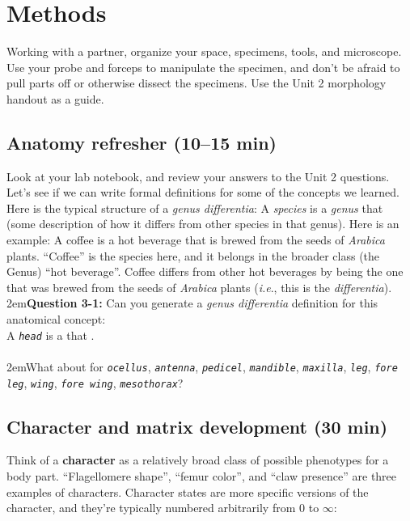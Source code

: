 \documentclass[letterpaper, 11pt]{article}
\newcommand{\latinword}[1]{\texttt{\itshape #1}}%
\begin{document}
\section*{Methods}
Working with a partner, organize your space, specimens, tools, and microscope. Use your probe and forceps to manipulate the specimen, and don't be afraid to pull parts off or otherwise dissect the specimens. Use the Unit 2 morphology handout as a guide.

\subsection{Anatomy refresher (10--15 min)}
Look at your lab notebook, and review your answers to the Unit 2 questions. Let's see if we can write formal  definitions for some of the concepts we learned. Here is the typical structure of a \textit{genus differentia}: A \textit{species} is a \textit{genus} that (some description of how it differs from other species in that genus). Here is an example: A coffee is a hot beverage that is brewed from the seeds of \textit{Arabica} plants. ``Coffee'' is the species here, and it belongs in the broader class (the Genus) ``hot beverage''. Coffee differs from other hot beverages by being the one that was brewed from the seeds of \textit{Arabica} plants (\textit{i.e}., this is the \textit{differentia}).\\

\hangindent2em\textbf{Question 3-1:} Can you generate a \textit{genus differentia} definition for this anatomical concept: \\

A \latinword{head} is a \makebox[30 mm]{\hrulefill} that \hrulefill.\\ \\

\hangindent2em{}What about for \latinword{ocellus}, \latinword{antenna}, \latinword{pedicel}, \latinword{mandible}, \latinword{maxilla}, \latinword{leg}, \latinword{fore leg}, \latinword{wing}, \latinword{fore wing}, \latinword{mesothorax}? \\

\subsection{Character and matrix development (30 min)}
Think of a \textbf{character} as a relatively broad class of possible phenotypes for a body part. ``Flagellomere shape'', ``femur color'', and ``claw presence'' are three examples of characters. Character states are more specific versions of the character, and they're typically numbered arbitrarily from 0 to $\infty$:\\
\end{document}
